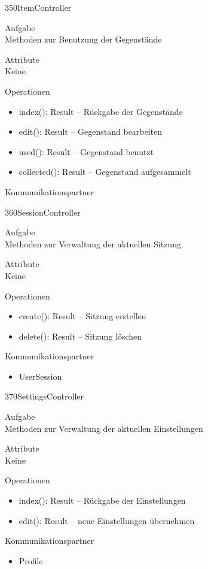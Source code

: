 \newpage
\begin{class}{350}{ItemController}
\item[Aufgabe]~\\
Methoden zur Benutzung der Gegenstände
\item[Attribute]~\\
Keine
\item[Operationen]~\\
\begin{itemize}
\item index(): Result -- Rückgabe der Gegenstände
\item edit(): Result -- Gegenstand bearbeiten
\item used(): Result -- Gegenstand benutzt
\item collected(): Result -- Gegenstand aufgesammelt
\end{itemize}
\item[Kommunikationspartner]~\\
\end{class}

\newpage
\begin{class}{360}{SessionController}
\item[Aufgabe]~\\
Methoden zur Verwaltung der aktuellen Sitzung
\item[Attribute]~\\
Keine
\item[Operationen]~\\
\begin{itemize}
\item create(): Result -- Sitzung erstellen
\item delete(): Result -- Sitzung löschen
\end{itemize}
\item[Kommunikationspartner]~\\
\begin{itemize}
\item UserSession
\end{itemize}
\end{class}

\newpage
\begin{class}{370}{SettingsController}
\item[Aufgabe]~\\
Methoden zur Verwaltung der aktuellen Einstellungen
\item[Attribute]~\\
Keine
\item[Operationen]~\\
\begin{itemize}
\item index(): Result -- Rückgabe der Einstellungen
\item edit(): Result -- neue Einstellungen übernehmen
\end{itemize}
\item[Kommunikationspartner]~\\
\begin{itemize}
\item Profile
\end{itemize}
\end{class}

